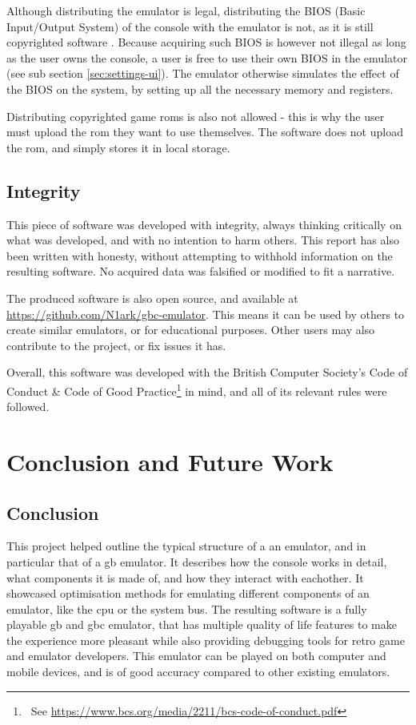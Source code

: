 \documentclass[11pt]{report}
\newcommand{\ftnt}[1]{\footnote{~See \url{#1}}}
\begin{document}
Although distributing the emulator is legal, distributing the BIOS (Basic Input/Output System) of the console with the emulator is not, as it is still copyrighted software \cite{emulation_white_paper}. Because acquiring such BIOS is however not illegal as long as the user owns the console, a user is free to use their own BIOS in the emulator (see sub section \ref{sec:settings-ui}). The emulator otherwise simulates the effect of the BIOS on the system, by setting up all the necessary memory and registers.

Distributing copyrighted game \glspl{rom} is also not allowed - this is why the user must upload the \gls{rom} they want to use themselves. The software does not upload the \gls{rom}, and simply stores it in local storage.

\section{Integrity}

This piece of software was developed with integrity, always thinking critically on what was developed, and with no intention to harm others. This report has also been written with honesty, without attempting to withhold information on the resulting software. No acquired data was falsified or modified to fit a narrative.

The produced software is also open source, and available at \url{https://github.com/N1ark/gbc-emulator}. This means it can be used by others to create similar emulators, or for educational purposes. Other users may also contribute to the project, or fix issues it has.

Overall, this software was developed with the British Computer Society's Code of Conduct \& Code of Good Practice\ftnt{https://www.bcs.org/media/2211/bcs-code-of-conduct.pdf} in mind, and all of its relevant rules were followed.

\chapter{Conclusion and Future Work}

\section{Conclusion}

This project helped outline the typical structure of a an emulator, and in particular that of a \glsdesc{gb} emulator. It describes how the console works in detail, what components it is made of, and how they interact with eachother. It showcased optimisation methods for emulating different components of an emulator, like the \gls{cpu} or the system bus. The resulting software is a fully playable \glsdesc{gb} and \glsdesc{gbc} emulator, that has multiple quality of life features to make the experience more pleasant while also providing debugging tools for retro game and emulator developers. This emulator can be played on both computer and mobile devices, and is of good accuracy compared to other existing emulators.
\end{document}
